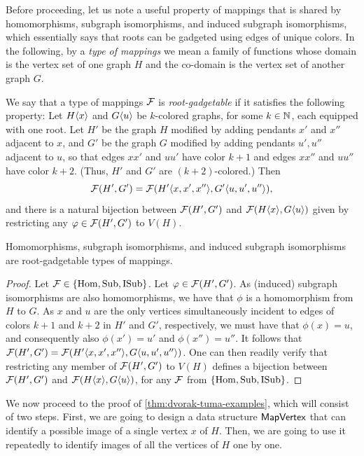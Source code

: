 

\bigskip

Before proceeding, let us note a useful property of mappings that is shared by homomorphisms, subgraph isomorphisms, and induced subgraph isomorphisms, which essentially says that roots can be gadgeted using edges of unique colors. In the following, by a \emph{type of mappings} we mean a family of functions whose domain is the vertex set of one graph $H$ and the co-domain is the vertex set of another graph $G$.

\begin{definition}
	We say that a type of mappings $\mathcal{F}$ is \textit{root-gadgetable} if it satisfies the following property: Let $H\langle x\rangle$ and $G\langle u\rangle$ be $k$-colored graphs, for some $k\in \mathbb{N}$, each equipped with one root. Let $H'$ be the graph $H$ modified by adding pendants $x'$ and $x''$ adjacent to $x$, and  $G'$ be the graph $G$ modified by adding pendants $u', u''$ adjacent to $u$, so that edges $xx'$ and $uu'$ have color $k+1$ and edges $xx''$ and $uu''$ have color $k+2$. (Thus, $H'$ and $G'$ are $(k+2)$-colored.) Then
	\[\mathcal{F}(H',G') = \mathcal{F}(H'\langle x,x',x''\rangle,G'\langle u,u',u''\rangle),\]
	and there is a natural bijection between $\mathcal{F}(H', G')$ and $\mathcal{F}(H\langle x\rangle,G\langle u\rangle)$ given by restricting any $\varphi \in \mathcal{F}(H', G')$ to  $V(H)$. 
\end{definition}

\begin{lemma}\label{lem:root-gadget}
	Homomorphisms, subgraph isomorphisms, and induced subgraph isomorphisms are root-gadgetable types of mappings.
\end{lemma}
\begin{proof}
	Let $\mathcal{F} \in \{\mathrm{Hom}, \mathrm{Sub}, \mathrm{ISub}\}$. Let $\varphi \in \mathcal{F}(H', G')$. As (induced) subgraph isomorphisms are also homomorphisms, we have that $\phi$ is a homomorphism from $H$ to $G$. As $x$ and $u$ are the only vertices simultaneously incident to edges of colors $k+1$ and $k+2$ in $H'$ and $G'$, respectively, we must have that $\phi(x)=u$, and consequently also $\phi(x') = u'$ and $\phi(x'') = u''$. It follows that $\mathcal{F}(H',G') = \mathcal{F}(H'\langle x,x',x''\rangle,G\langle u,u',u''\rangle)$. One can then readily verify that restricting any member of $\mathcal{F}(H', G')$ to $V(H)$ defines a bijection between $\mathcal{F}(H', G')$ and $\mathcal{F}(H\langle x\rangle, G\langle u\rangle)$, for any $\mathcal{F}$ from $\{\mathrm{Hom}, \mathrm{Sub}, \mathrm{ISub}\}$.
\end{proof}

We now proceed to the proof of \cref{thm:dvorak-tuma-examples}, which will consist of two steps. First, we are going to design a data structure $\mathsf{MapVertex}$ that can identify a possible image of a single vertex $x$ of $H$. Then, we are going to use it repeatedly to identify images of all the vertices of $H$ one by one.

